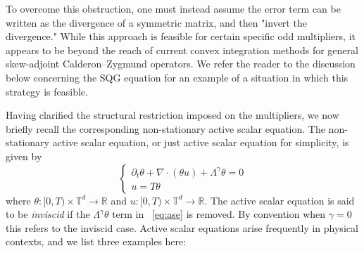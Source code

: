 \documentclass[12pt,reqno,letterpaper]{amsart}
\numberwithin{equation}{section}
\newcommand{\1}{{\bf 1}}
\newcommand{\2}{{\bf 2}}
\newcommand{\R}{\mathbb R}
\newcommand{\T}{\mathbb T}
\theoremstyle{remark}
\theoremstyle{remark}
\begin{document}
To overcome this obstruction, one must instead assume the error term can be written as the divergence of a symmetric matrix, and then "invert the divergence." While this approach is feasible for certain specific odd multipliers, it appears to be beyond the reach of current convex integration methods for general skew-adjoint Calderon–Zygmund operators. We refer the reader to the discussion below concerning the SQG equation for an example of a situation in which this strategy is feasible.


Having clarified the structural restriction imposed on the  multipliers, we now briefly recall the corresponding non-stationary active scalar equation. The non-stationary active scalar equation, or just active scalar equation for simplicity, is given by
\begin{equation}\label{eq:ase}
    \begin{cases}
        \partial_t \theta + \nabla \cdot (\theta u) + \Lambda^\gamma \theta = 0\\
        u = T\theta
    \end{cases}
\end{equation}
where $\theta: [0,T) \times \T^d \to \R$ and $u:[0,T) \times \T^d \to \R$. The active scalar equation is said to be \textit{inviscid} if the $\Lambda^\gamma \theta$ term in ~\eqref{eq:ase} is removed. By convention when $\gamma = 0$ this refers to the inviscid case. Active scalar equations arise frequently in physical contexts, and we list three examples here:
\end{document}
